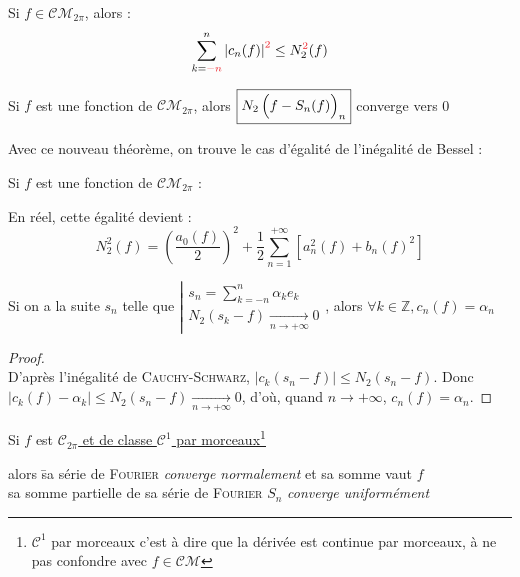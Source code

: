 \documentclass[11pt,a4paper,fleqn,pdftex]{report}
\begin{document}
\begin{theorem}
Si $f \in \mathcal{CM}_{2\pi}$, alors : \[\sum_{k=\textcolor{Red}{-n}}^{n} \left| c_n(f) \right| ^{\textcolor{Red}{2}}\le N_2^{\textcolor{Red}{2}}(f)\]
\end{theorem}
\begin{theorem}
Si $f$ est une fonction de \uline{$\mathcal{CM}_{2\pi}$}, alors $\boxed{N_2\left(\vphantom{{3^3}^3} f-S_n(f) \right)_n}$ converge vers 0
\end{theorem}
Avec ce nouveau théorème, on trouve le cas d'égalité de l'inégalité de Bessel :
\begin{itheorem}
Si $f$ est une fonction de \uline{$\mathcal{CM}_{2\pi}$} : 
\begin{center}
\end{center}
En réel, cette égalité devient : 
\[
N_2^2(f) = \left( \dfrac{a_0(f)}{2} \right) ^2 + \frac{1}{2}\sum_{n=1}^{+\infty} \left[ a_n^2(f) + b_n(f)^2 \right]
\]
\end{itheorem}
\begin{theorem}
    Si on a la suite $s_n$ telle que $\left| \begin{gathered} s_n = \sum_{k=-n}^n \alpha_k e_k \\ N_2(s_k - f) \xrightarrow[n\to +\infty ]{} 0 \end{gathered}\right. $, alors $\forall k\in \mathbb{Z}, c_n(f) = \alpha_n$
\end{theorem}
    \begin{proof}\hfill \\
        D'après l'inégalité de \textsc{Cauchy}-\textsc{Schwarz}, $|c_k(s_n - f)|\le N_2(s_n - f)$. Donc $|c_k(f) - \alpha_k|\le N_2(s_n - f) \xrightarrow[n\to +\infty]{} 0$, d'où, quand $n\to +\infty$, $c_n(f) = \alpha_n$.
    \end{proof}
\begin{itheorem}
Si $f$ est \underline{$\mathcal{C}_{2\pi}$ et de classe $\mathcal{C}^1$ par morceaux\footnote{$\mathcal{C}^1$ par morceaux c'est à dire que la dérivée est continue par morceaux, à ne pas confondre avec $f \in \mathcal{CM}$}}
\begin{tabbing}
alors \= sa série de \textsc{Fourier} \emph{converge normalement} et sa somme vaut $f$ \\
 \> sa somme partielle de sa série de \textsc{Fourier} $S_n$ \emph{converge uniformément}
\end{tabbing}
\end{itheorem}
\end{document}

